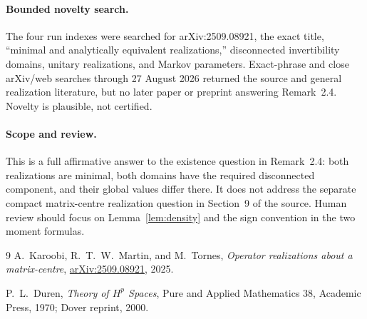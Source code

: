 \documentclass[11pt]{article}
\begin{document}
\paragraph{Bounded novelty search.}
The four run indexes were searched for arXiv:2509.08921, the exact title,
``minimal and analytically equivalent realizations,'' disconnected
invertibility domains, unitary realizations, and Markov parameters.
Exact-phrase and close arXiv/web searches through 27 August 2026 returned the
source and general realization literature, but no later paper or preprint
answering Remark~2.4. Novelty is plausible, not certified.

\paragraph{Scope and review.}
This is a full affirmative answer to the existence question in Remark~2.4:
both realizations are minimal, both domains have the required disconnected
component, and their global values differ there. It does not address the
separate compact matrix-centre realization question in Section~9 of the source.
Human review should focus on Lemma~\ref{lem:density} and the sign convention in
the two moment formulas.

\begingroup
\sloppy
\raggedright
\begin{thebibliography}{9}
A.~Karoobi, R.~T.~W.~Martin, and M.~Tornes,
\emph{Operator realizations about a matrix-centre},
\href{https://arxiv.org/abs/2509.08921}{arXiv:2509.08921}, 2025.

P.~L.~Duren,
\emph{Theory of $H^p$ Spaces},
Pure and Applied Mathematics 38, Academic Press, 1970;
Dover reprint, 2000.
\end{thebibliography}
\endgroup
\end{document}
